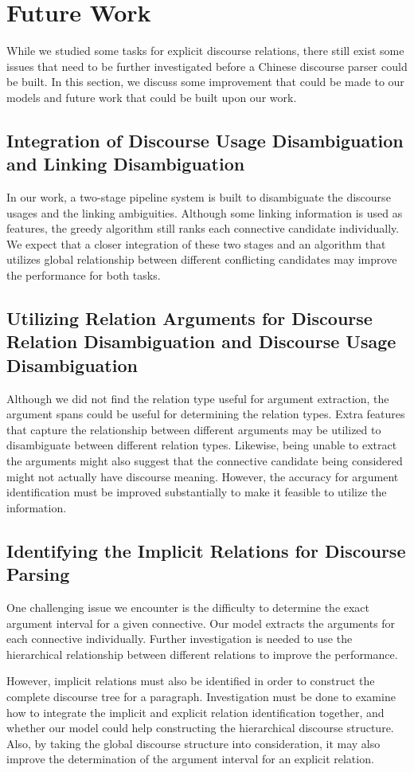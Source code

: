 \section{Future Work}

While we studied some tasks for explicit discourse relations,
there still exist some issues that need to be further investigated
before a Chinese discourse parser could be built. In this section,
we discuss some improvement that could be made to our models and
future work that could be built upon our work.

\subsection{Integration of Discourse Usage Disambiguation and Linking Disambiguation}

In our work, a two-stage pipeline system is built to disambiguate
the discourse usages and the linking ambiguities. Although some linking
information is used as features, the greedy algorithm still ranks
each connective candidate individually. We expect that a closer integration
of these two stages and an algorithm that utilizes global relationship
between different conflicting candidates may improve the performance
for both tasks.

\subsection{Utilizing Relation Arguments for Discourse Relation Disambiguation
and Discourse Usage Disambiguation}

Although we did not find the relation type useful for
argument extraction, the argument spans could be useful for determining
the relation types.  Extra features that capture the relationship between
different arguments may be utilized to disambiguate between different relation
types. Likewise, being unable to extract the arguments might also suggest
that the connective candidate being considered might not actually have discourse
meaning. However, the accuracy for argument identification must be improved
substantially to make it feasible to utilize the information.

\subsection{Identifying the Implicit Relations for Discourse Parsing}

One challenging issue we encounter is the difficulty to determine
the exact argument interval for a given connective. Our model extracts
the arguments for each connective individually. Further investigation
is needed to use the hierarchical relationship between different
relations to improve the performance.

However, implicit relations must also be identified in order
to construct the complete discourse tree for a paragraph.
Investigation must be done to examine how to integrate the implicit and
explicit relation identification together, and whether our model
could help constructing the hierarchical discourse structure.
Also, by taking the global discourse structure into
consideration, it may also improve the determination of the argument interval
for an explicit relation.
